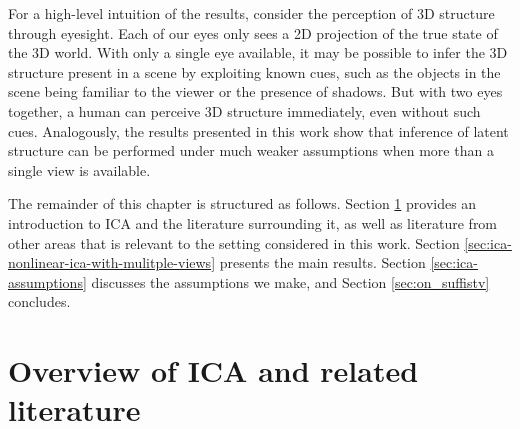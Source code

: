For a high-level intuition of the results, consider the perception of 3D structure through eyesight.
Each of our eyes only sees a 2D projection of the true state of the 3D world.
With only a single eye available, it may be possible to infer the 3D structure present in a scene by exploiting known cues, such as the objects in the scene being familiar to the viewer or the presence of shadows.
But with two eyes together, a human can perceive 3D structure immediately, even without such cues. 
Analogously, the results presented in this work show that inference of latent structure can be performed under much weaker assumptions when more than a single view is available.


The remainder of this chapter is structured as follows.
Section \ref{sec:ica-literature-overview} provides an introduction to ICA and the literature surrounding it, as well as literature from other areas that is relevant to the setting considered in this work.
Section \ref{sec:ica-nonlinear-ica-with-mulitple-views} presents the main results.
Section \ref{sec:ica-assumptions} discusses the assumptions we make, and Section \ref{sec:on_suffistv} concludes.




\section{Overview of ICA and related literature}\label{sec:ica-literature-overview}

